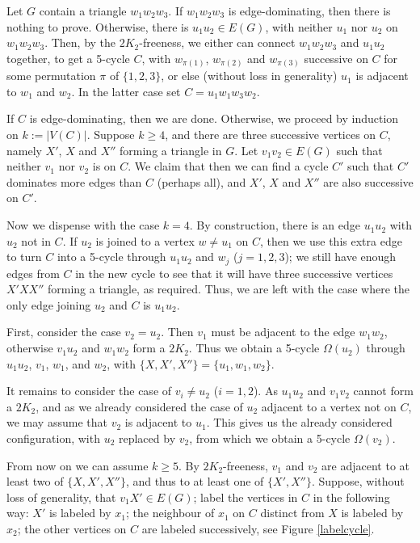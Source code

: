 \documentclass[runningheads,a4paper]{llncs}
\begin{document}
Let $G$  contain a triangle $w_1w_2w_3$.  If $w_1w_2w_3$ is edge-dominating,
then there is nothing to prove. Otherwise, there is $u_1u_2\in
E(G)$, with neither $u_1$ nor $u_2$  on $w_1w_2w_3$.  Then, by the
$2K_2$-freeness, we either can connect $w_1w_2w_3$ and $u_1u_2$ together, to get a
5-cycle $C$, with $w_{\pi(1)}$, $w_{\pi(2)}$ and $w_{\pi(3)}$ successive on $C$
for some permutation $\pi$ of $\{1,2,3\}$, or else (without loss in generality)
$u_1$ is adjacent to $w_1$ and $w_2$. In the latter case set $C=u_1w_1w_3w_2$.

If $C$ is edge-dominating, then we are done. Otherwise, we proceed by induction on
$k:=|V(C)|$. 
Suppose $k\ge 4$, and there are three successive vertices on $C$, namely $X'$, $X$ and $X''$ forming a triangle in $G$. 
Let $v_1v_2\in E(G)$ such that neither $v_1$ nor $v_2$ is on $C$.
We claim that then we can find a cycle $C'$ such that $C'$ dominates more edges than $C$ (perhaps all), 
and $X'$, $X$ and $X''$ are also successive on $C'$.

Now we dispense with the case $k=4$. By construction, there is an edge $u_1u_2$
with $u_2$ not in $C$. If $u_2$ is joined to a vertex $w\neq u_1$ on $C$,
then we use this extra edge to turn $C$ into a 5-cycle through $u_1u_2$
and $w_j$ ($j=1,2,3$); we still have enough edges from $C$ in the new cycle to see
that it will have three successive vertices $X'XX''$ forming a triangle, as required.
Thus, we are left with the case where the only edge joining $u_2$ and $C$ is $u_1u_2$.

First, consider the case $v_2=u_2$. Then $v_1$ must be adjacent to the edge $w_1w_2$,
otherwise $v_1u_2$ and $w_1w_2$ form a $2K_2$. Thus we obtain a 5-cycle $\Omega(u_2)$
through $u_1u_2$, $v_1$, $w_1$, and $w_2$, with $\{X,X',X''\}=\{u_1,w_1,w_2\}$.

It remains to consider the case of $v_i\neq u_2$ ($i=1,2$).
As $u_1u_2$ and $v_1v_2$ cannot form a $2K_2$, and as we already considered
the case of $u_2$ adjacent to a vertex not on $C$, we may assume that
$v_2$ is adjacent to $u_1$. This gives us the already considered configuration,
with $u_2$ replaced by $v_2$, from which we obtain a 5-cycle $\Omega(v_2)$.

\medskip

From now on we can assume $k\geq 5$.
By $2K_2$-freeness, $v_1$ and $v_2$ are adjacent to at least two of $\{X,X',X''\}$,
and thus to at least one of $\{X',X''\}$.  Suppose,
without loss of generality, that $v_1X'\in E(G)$; label the vertices in $C$ in the following way:
$X'$ is labeled by $x_1$; the neighbour of $x_1$ on $C$ distinct from $X$ is labeled by $x_2$;
the other vertices on $C$ are labeled successively, see Figure \ref{labelcycle}.
\end{document}

